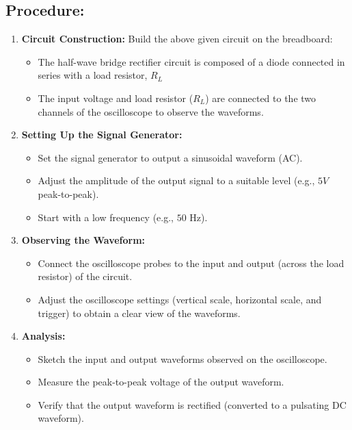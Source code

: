\subsection*{Procedure:}
\begin{enumerate}
    \item \textbf{Circuit Construction:} Build the above given circuit on the breadboard:
    \begin{itemize}
        \item The half-wave bridge rectifier circuit is composed of a diode connected in series with a load resistor, $R_L$
        \item The input voltage and load resistor ($R_L$) are connected to the two channels of the oscilloscope to observe the waveforms.
    \end{itemize}

    \item \textbf{Setting Up the Signal Generator:}
    \begin{itemize}
        \item Set the signal generator to output a sinusoidal waveform (AC).
        \item Adjust the amplitude of the output signal to a suitable level (e.g., $5V$ peak-to-peak).
        \item Start with a low frequency (e.g., $50$ Hz).
    \end{itemize}

    \item \textbf{Observing the Waveform:}
    \begin{itemize}
        \item Connect the oscilloscope probes to the input and output (across the load resistor) of the circuit.
        \item Adjust the oscilloscope settings (vertical scale, horizontal scale, and trigger) to obtain a clear view of the waveforms.
    \end{itemize}

    \item \textbf{Analysis:}
    \begin{itemize}
        \item Sketch the input and output waveforms observed on the oscilloscope.
        \item Measure the peak-to-peak voltage of the output waveform.
        \item Verify that the output waveform is rectified (converted to a pulsating DC waveform).
    \end{itemize}
\end{enumerate}

